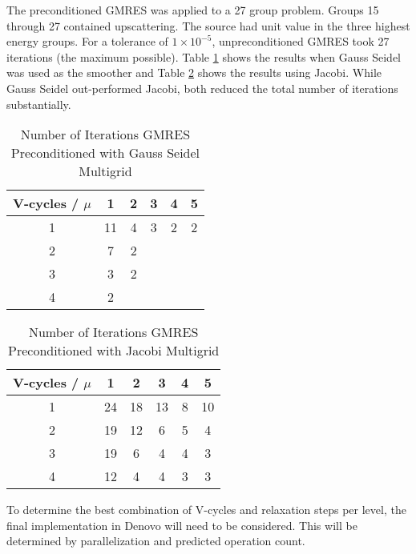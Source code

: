 \documentclass[12pt, letterpaper]{article}
\begin{document}
The preconditioned GMRES was applied to a 27 group problem. Groups 15 through 27 contained upscattering. The source had unit value in the three highest energy groups. For a tolerance of $1 \times 10^{-5}$, unpreconditioned GMRES took 27 iterations (the maximum possible). Table \ref{table:GS} shows the results when Gauss Seidel was used as the smoother and Table \ref{table:Jacobi} shows the results using Jacobi. While Gauss Seidel out-performed Jacobi, both reduced the total number of iterations substantially. 
%
\begin{table}[!h]
\caption{Number of Iterations GMRES Preconditioned with Gauss Seidel Multigrid}
\begin{center}
\begin{tabular}{c | c c c c c}
V-cycles / $\mu$  & 1 & 2 & 3 & 4 & 5 \\
\hline
1 & 11 & 4 & 3 & 2 & 2 \\
2 & 7 & 2 \\
3 & 3 & 2\\
4 & 2\\
\hline
\end{tabular}
\end{center}
\label{table:GS}
\end{table}
%
\begin{table}[!h]
\caption{Number of Iterations GMRES Preconditioned with Jacobi Multigrid}
\begin{center}
\begin{tabular}{c | c c c c c}
V-cycles / $\mu$  & 1 & 2 & 3 & 4 & 5 \\
\hline
1 & 24 & 18 & 13 & 8 & 10 \\
2 & 19 & 12 & 6 & 5 & 4 \\
3 & 19 & 6 & 4 & 4 & 3\\
4 & 12 & 4 & 4 & 3 & 3\\
\hline
\end{tabular}
\end{center}
\label{table:Jacobi}
\end{table}

To determine the best combination of V-cycles and relaxation steps per level, the final implementation in Denovo will need to be considered. This will be determined by parallelization and predicted operation count. 
\end{document}
